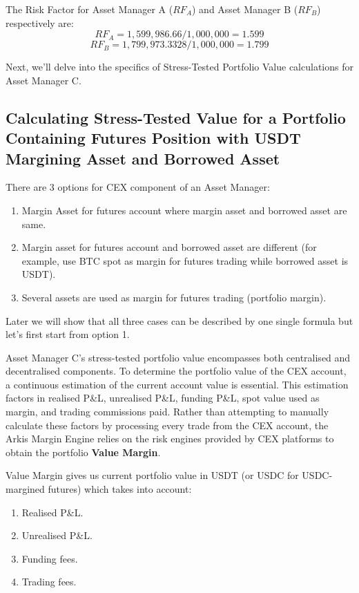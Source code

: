 \documentclass[conference]{IEEEtran}
\begin{document}
The Risk Factor for Asset Manager A ($RF_{A}$) and Asset Manager B ($RF_{B}$) respectively are:
$$RF_{A} = 1,599,986.66/1,000,000=1.599$$
$$RF_{B} = 1,799,973.3328​/1,000,000=1.799$$

Next, we'll delve into the specifics of Stress-Tested Portfolio Value calculations for Asset Manager C.

\subsection{Calculating Stress-Tested Value for a Portfolio Containing Futures Position with USDT Margining Asset and Borrowed Asset}

There are 3 options for CEX component of an Asset Manager:
\begin{enumerate}
	\item Margin Asset for futures account where margin asset and borrowed asset are same. 
	\item Margin asset for futures account and borrowed asset are different (for example, use BTC spot as margin for futures trading while borrowed asset is USDT).
	\item Several assets are used as margin for futures trading (portfolio margin). 
\end{enumerate}

Later we will show that all three cases can be described by one single formula but let's first start from option 1.

Asset Manager C's stress-tested portfolio value encompasses both centralised and decentralised components. To determine the portfolio value of the CEX account, a continuous estimation of the current account value is essential. This estimation factors in realised P\&L, unrealised P\&L, funding P\&L, spot value used as margin, and trading commissions paid. Rather than attempting to manually calculate these factors by processing every trade from the CEX account, the Arkis Margin Engine relies on the risk engines provided by CEX platforms to obtain the portfolio \textbf{Value Margin}.

Value Margin gives us current portfolio value in USDT (or USDC for USDC-margined futures) which takes into account:
\begin{enumerate}
	\item Realised P\&L.
	\item Unrealised P\&L.
	\item Funding fees.
	\item Trading fees.
\end{enumerate}
\end{document}

